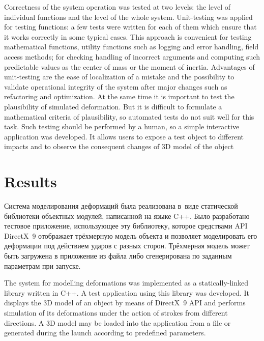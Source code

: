 \documentclass[a4paper, 12pt, titlepage]{extarticle}
\begin{document}
      Correctness of the system operation was tested at two levels: the level of individual
      functions and the level of the whole system. Unit-testing was applied for testing
      functions: a few tests were written for each of them which ensure that it works
      correctly in some typical cases. This approach is convenient for testing mathematical
      functions, utility functions such as logging and error handling, field access methods; for
      checking handling of incorrect arguments and computing such predictable values as the center
      of mass or the moment of inertia. Advantages of unit-testing are the ease of
      localization of a mistake and the possibility to validate operational integrity of the system
      after major changes such as refactoring and optimization. At the same time it is important to
      test the plausibility of simulated deformation. But it is difficult to formulate a
      mathematical criteria of plausibility, so automated tests do not suit well for this task. Such testing
      should be performed by a human, so a simple interactive application was developed. It allows
      users to expose a test object to different impacts and to observe the consequent changes of 3D
      model of the object

  \section{Results}\label{sec:results}

\begin{original}
    Система моделирования деформаций была реализована в~виде статической
    библиотеки объектных модулей, написанной на языке C++. Было разработано тестовое приложение,
    использующее эту библиотеку, которое средствами API DirectX~9 отображает трёхмерную модель
    объекта и позволяет моделировать его деформации под действием ударов с разных сторон. Трёхмерная
    модель может быть загружена в приложение из файла либо сгенерирована по заданным параметрам при
    запуске.
\end{original}

    The system for modelling deformations was implemented as a statically-linked library written in
    C++. A test application using this library was developed. It displays the 3D model of an object
    by means of DirectX~9 API and performs simulation of its deformations under the action of
    strokes from different directions. A 3D model may be loaded into the application from a file or
    generated during the launch according to predefined parameters.
\end{document}
